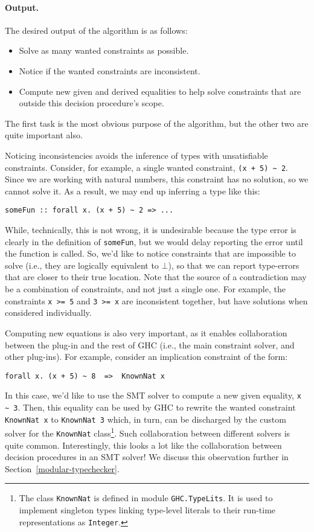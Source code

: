 \documentclass{sigplanconf}
\begin{document}
\paragraph{Output.} The desired output of the algorithm is as follows:
\begin{itemize}
  \item Solve as many wanted constraints as possible.
  \item Notice if the wanted constraints are inconsistent.
  \item Compute new given and derived equalities to help solve constraints
        that are outside this decision procedure's scope.
\end{itemize}
The first task is the most obvious purpose of the algorithm, but the other
two are quite important also.

Noticing inconsistencies avoids the inference of types with unsatisfiable
constraints.  Consider, for example, a single wanted constraint,
\Verb"(x + 5) ~ 2".  Since we are working with natural numbers,
this constraint has no solution, so we cannot solve it.
As a result, we may end up inferring a type like this:
\begin{Verbatim}
someFun :: forall x. (x + 5) ~ 2 => ...
\end{Verbatim}
While, technically, this is not wrong, it is undesirable because the type
error is clearly in the definition of \Verb"someFun", but we would delay
reporting the error until the function is called.  So, we'd like to
notice constraints that are impossible to solve (i.e., they are logically
equivalent to $\bot$), so that we can report type-errors that are closer
to their true location.  Note that the source of a contradiction may
be a combination of constraints, and not just a single one.  For example,
the constraints \Verb"x >= 5" and \Verb"3 >= x" are inconsistent together,
but have solutions when considered individually.

Computing new equations is also very important, as it enables collaboration
between the plug-in and the rest of GHC (i.e., the main constraint solver,
and other plug-ins).  For example, consider an implication constraint
of the form:
\begin{Verbatim}
forall x. (x + 5) ~ 8  =>  KnownNat x
\end{Verbatim}
In this case, we'd like to use the SMT solver to compute a new given
equality, \Verb"x ~ 3".  Then, this equality can be used by GHC to
rewrite the wanted constraint \Verb"KnownNat x" to \Verb"KnownNat 3"
which, in turn, can be discharged by the custom solver for the \Verb"KnownNat"
class\footnote{The class \Verb"KnownNat" is defined in module
\Verb"GHC.TypeLits".  It is used to implement singleton types linking
type-level literals to their run-time representations as \Verb"Integer".}.
Such collaboration between different solvers is quite common.
Interestingly, this looks a lot like the collaboration between decision
procedures in an SMT solver!  We discuss this observation further
in Section~\ref{modular-typechecker}.
\end{document}
